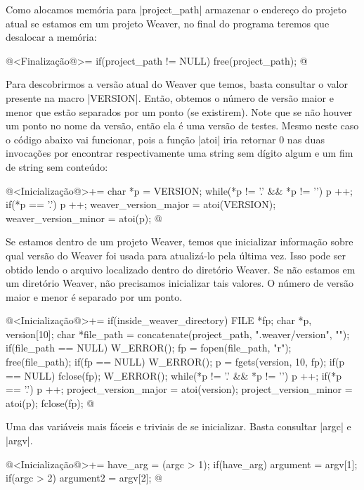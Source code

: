 {Como alocamos memória para |project_path| armazenar o endereço do
projeto atual se estamos em um projeto Weaver, no final do programa
teremos que desalocar a memória:

\iniciocodigo
@<Finalização@>=
if(project_path != NULL) free(project_path);
@
\fimcodigo


Para descobrirmos a versão atual do Weaver que temos, basta consultar
o valor presente na macro |VERSION|. Então, obtemos o número de versão
maior e menor que estão separados por um ponto (se existirem). Note
que se não houver um ponto no nome da versão, então ela é uma versão
de testes. Mesmo neste caso o código abaixo vai funcionar, pois a
função |atoi| iria retornar 0 nas duas invocações por encontrar
respectivamente uma string sem dígito algum e um fim de string sem
conteúdo:

\iniciocodigo
@<Inicialização@>+=
{
  char *p = VERSION;
  while(*p != '.' && *p != '\0') p ++;
  if(*p == '.') p ++;
  weaver_version_major = atoi(VERSION);
  weaver_version_minor = atoi(p);
}
@
\fimcodigo


Se estamos dentro de um projeto Weaver, temos que inicializar
informação sobre qual versão do Weaver foi usada para atualizá-lo pela
última vez. Isso pode ser obtido lendo o arquivo
 localizado dentro do diretório Weaver. Se não
estamos em um diretório Weaver, não precisamos inicializar tais
valores. O número de versão maior e menor é separado por um ponto.

\iniciocodigo
@<Inicialização@>+=
if(inside_weaver_directory){
  FILE *fp;
  char *p, version[10];
  char *file_path = concatenate(project_path, ".weaver/version", "");
  if(file_path == NULL) W_ERROR();
  fp = fopen(file_path, "r");
  free(file_path);
  if(fp == NULL) W_ERROR();
  p = fgets(version, 10, fp);
  if(p == NULL){ fclose(fp); W_ERROR(); }
  while(*p != '.' && *p != '\0') p ++;
  if(*p == '.') p ++;
  project_version_major = atoi(version);
  project_version_minor = atoi(p);
  fclose(fp);
}
@
\fimcodigo


Uma das variáveis mais fáceis e triviais de se inicializar. Basta
consultar |argc| e |argv|.

\iniciocodigo
@<Inicialização@>+=
have_arg = (argc > 1);
if(have_arg) argument = argv[1];
if(argc > 2) argument2 = argv[2];
@
\fimcodigo

}
